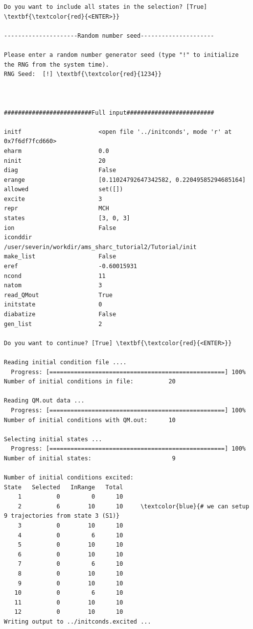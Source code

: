 \documentclass[a4paper,11pt,DIV=15,openany]{scrbook}
\begin{document}
\begin{oframed}
\begin{Verbatim}[commandchars=\\\{\}]
Do you want to include all states in the selection? [True] \textbf{\textcolor{red}{<ENTER>}}

---------------------Random number seed---------------------

Please enter a random number generator seed (type "!" to initialize the RNG from the system time).
RNG Seed:  [!] \textbf{\textcolor{red}{1234}}



#########################Full input#########################

initf                      <open file '../initconds', mode 'r' at 0x7f6df7fcd660>
eharm                      0.0
ninit                      20
diag                       False
erange                     [0.11024792647342582, 0.22049585294685164]
allowed                    set([])
excite                     3
repr                       MCH
states                     [3, 0, 3]
ion                        False
iconddir                   /user/severin/workdir/ams_sharc_tutorial2/Tutorial/init
make_list                  False
eref                       -0.60015931
ncond                      11
natom                      3
read_QMout                 True
initstate                  0
diabatize                  False
gen_list                   2

Do you want to continue? [True] \textbf{\textcolor{red}{<ENTER>}}

Reading initial condition file ....
  Progress: [==================================================] 100%
Number of initial conditions in file:          20

Reading QM.out data ...
  Progress: [==================================================] 100%
Number of initial conditions with QM.out:      10

Selecting initial states ...
  Progress: [==================================================] 100%
Number of initial states:                       9

Number of initial conditions excited:
State   Selected   InRange   Total
    1          0         0      10
    2          6        10      10     \textcolor{blue}{# we can setup 9 trajectories from state 3 (S1)}
    3          0        10      10
    4          0         6      10
    5          0        10      10
    6          0        10      10
    7          0         6      10
    8          0        10      10
    9          0        10      10
   10          0         6      10
   11          0        10      10
   12          0        10      10
Writing output to ../initconds.excited ...
\end{Verbatim}
\end{oframed}
\end{document}
